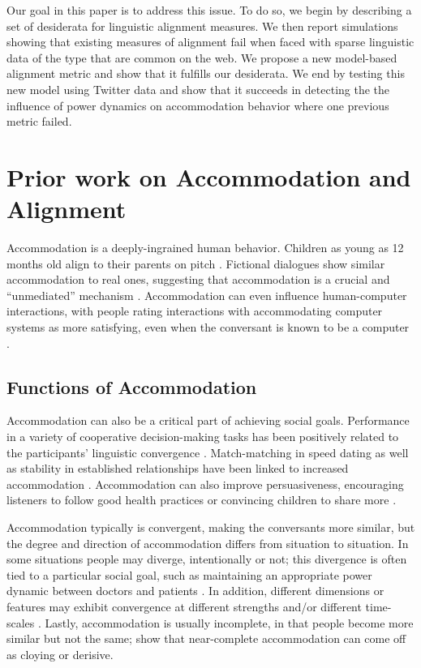 \documentclass{acm_proc_article-sp}
\begin{document}
Our goal in this paper is to address this issue. To do so, we begin by describing a set of desiderata for linguistic alignment measures. We then report simulations showing that existing measures of alignment fail when faced with sparse linguistic data of the type that are common on the web. We propose a new model-based alignment metric and show that it fulfills our desiderata. We end by testing this new model using Twitter data and show that it succeeds in detecting the the influence of power dynamics on accommodation behavior where one previous metric failed. 

\section{Prior work on Accommodation and Alignment}

Accommodation is a deeply-ingrained human behavior.  Children as young as 12 months old align to their parents on pitch \cite{Lieberman1967}.  Fictional dialogues show similar accommodation to real ones, suggesting that accommodation is a crucial and ``unmediated'' mechanism \cite{PickeringGarrod2004,DNMLee2011}.  Accommodation can even influence human-computer interactions, with people rating interactions with accommodating computer systems as more satisfying, even when the conversant is known to be a computer \cite{NassLee2000,vanBaarenEtAl2003,BraniganEtAl2010}.

\subsection{Functions of Accommodation}
Accommodation can also be a critical part of achieving social goals.  Performance in a variety of cooperative decision-making tasks has been positively related to the participants' linguistic convergence \cite{FusaroliEtAl2012,KacewiczEtAl2013}.  Match-matching in speed dating as well as stability in established relationships have been linked to increased accommodation \cite{IrelandEtAl2011}.  Accommodation can also improve persuasiveness, encouraging listeners to follow good health practices \cite{KlineCeropski1984} or convincing children to share more \cite{BurlesonFennelly1981}.

Accommodation typically is convergent, making the conversants more similar, but the degree and direction of accommodation differs from situation to situation. In some situations people may diverge, intentionally or not; this divergence is often tied to a particular social goal, such as maintaining an appropriate power dynamic between doctors and patients \cite{Ferrara1991}. In addition, different dimensions or features may exhibit convergence at different strengths \cite{ThakerarGilesCheshire1982,BilousKrauss1988,DNMGamonDumais2011} and/or different time-scales \cite{Ferrara1991}.  Lastly, accommodation is usually incomplete, in that people become more similar but not the same; \cite{GilesCouplandCoupland1991,GilesSmith1979} show that near-complete accommodation can come off as cloying or derisive.
\end{document}
